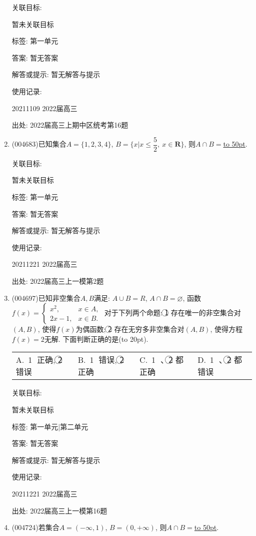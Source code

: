 \documentclass[10pt,a4paper]{article}
\newcommand{\blank}[1]{\underline{\hbox to #1pt{}}}
\newcommand{\bracket}[1]{(\hbox to #1pt{})}
\newcommand{\fourch}[4]{\par\begin{tabular}{p{.23\textwidth}p{.23\textwidth}p{.23\textwidth}p{.23\textwidth}}
A.~#1 &B.~#2& C.~#3& D.~#4
\end{tabular}}
\begin{document}
\begin{enumerate}[1.]
关联目标:

暂未关联目标



标签: 第一单元

答案: 暂无答案

解答或提示: 暂无解答与提示

使用记录:

20211109	2022届高三	


出处: 2022届高三上期中区统考第16题
\item { (004683)}已知集合$A=\{1,2,3,4\}$, $B=\{x|x\le \dfrac 52, \ x\in \mathbf{R}\}$, 则$A\cap B=$\blank{50}.


关联目标:

暂未关联目标



标签: 第一单元

答案: 暂无答案

解答或提示: 暂无解答与提示

使用记录:

20211221	2022届高三	


出处: 2022届高三上一模第2题
\item { (004697)}已知非空集合$A,B$满足: $A\cup B=R$, $A\cap B=\varnothing$, 函数$f(x)=\begin{cases}
x^2, &  x\in A,  \\ 2x-1, &  x\in B.  \end{cases}$ 对于下列两个命题: \textcircled{1} 存在唯一的非空集合对$(A,B)$, 使得$f(x)$为偶函数; \textcircled{2} 存在无穷多非空集合对$(A,B)$, 使得方程$f(x)=2$无解. 下面判断正确的是\bracket{20}.
\fourch{\textcircled{1} 正确, \textcircled{2} 错误}{\textcircled{1} 错误, \textcircled{2} 正确}{\textcircled{1} 、\textcircled{2} 都正确}{\textcircled{1} 、\textcircled{2} 都错误}


关联目标:

暂未关联目标



标签: 第一单元|第二单元

答案: 暂无答案

解答或提示: 暂无解答与提示

使用记录:

20211221	2022届高三	


出处: 2022届高三上一模第16题
\item { (004724)}若集合$A=(-\infty ,1)$, $B=(0,+\infty)$, 则$A\cap B=$\blank{50}.



\end{enumerate}
\end{document}
